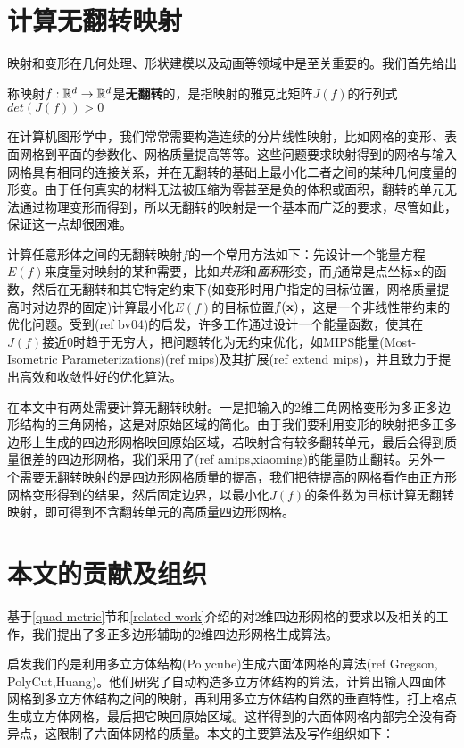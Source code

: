 \section{计算无翻转映射}\label{invertion-free}
映射和变形在几何处理、形状建模以及动画等领域中是至关重要的。我们首先给出
\begin{definition}\label{def:local-injective}
称映射$f:\mathbb{R}^d \rightarrow \mathbb{R}^d$是\textbf{无翻转}的，是指映射的雅克比矩阵$J(f)$的行列式$det(J(f))>0$
\end{definition}
在计算机图形学中，我们常常需要构造连续的分片线性映射，比如网格的变形、表面网格到平面的参数化、网格质量提高等等。这些问题要求映射得到的网格与输入网格具有相同的连接关系，并在无翻转的基础上最小化二者之间的某种几何度量的形变。由于任何真实的材料无法被压缩为零甚至是负的体积或面积，翻转的单元无法通过物理变形而得到，所以无翻转的映射是一个基本而广泛的要求，尽管如此，保证这一点却很困难。

计算任意形体之间的无翻转映射$f$的一个常用方法如下：先设计一个能量方程$E(f)$来度量对映射的某种需要，比如\emph{共形}和\emph{面积}形变，而$f$通常是点坐标$\mathbf{x}$的函数，然后在无翻转和其它特定约束下(如变形时用户指定的目标位置，网格质量提高时对边界的固定)计算最小化$E(f)$的目标位置$f(\mathbf{x})$，这是一个非线性带约束的优化问题。受到(ref bv04)的启发，许多工作通过设计一个能量函数，使其在$J(f)$接近0时趋于无穷大，把问题转化为无约束优化，如MIPS能量(Most-Isometric Parameterizations)(ref mips)及其扩展(ref extend mips)，并且致力于提出高效和收敛性好的优化算法。

在本文中有两处需要计算无翻转映射。一是把输入的2维三角网格变形为多正多边形结构的三角网格，这是对原始区域的简化。由于我们要利用变形的映射把多正多边形上生成的四边形网格映回原始区域，若映射含有较多翻转单元，最后会得到质量很差的四边形网格，我们采用了(ref amips,xiaoming)的能量防止翻转。另外一个需要无翻转映射的是四边形网格质量的提高，我们把待提高的网格看作由正方形网格变形得到的结果，然后固定边界，以最小化$J(f)$的条件数为目标计算无翻转映射，即可得到不含翻转单元的高质量四边形网格。


\section{本文的贡献及组织}\label{contri-organ}
基于\ref{quad-metric}节和\ref{related-work}介绍的对2维四边形网格的要求以及相关的工作，我们提出了多正多边形辅助的2维四边形网格生成算法。%

启发我们的是利用多立方体结构(Polycube)生成六面体网格的算法(ref Gregson, PolyCut,Huang)。他们研究了自动构造多立方体结构的算法，计算出输入四面体网格到多立方体结构之间的映射，再利用多立方体结构自然的垂直特性，打上格点生成立方体网格，最后把它映回原始区域。这样得到的六面体网格内部完全没有奇异点，这限制了六面体网格的质量。本文的主要算法及写作组织如下：

